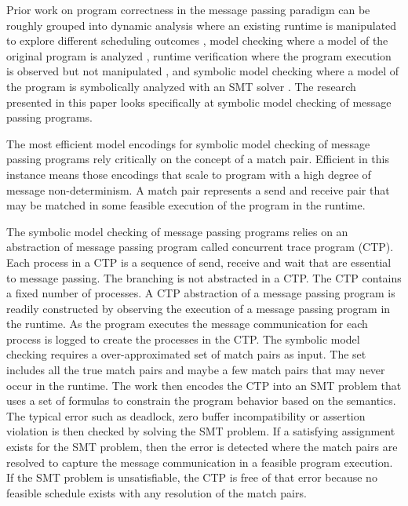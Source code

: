 Prior work on program correctness in the message passing paradigm can be roughly grouped into dynamic analysis where an existing runtime is manipulated to explore different scheduling outcomes \cite{DBLP:conf/ppopp/VakkalankaSGK08,DBLP:conf/sbmf/SharmaGB12}, model checking where a model of the original program is analyzed \cite{DBLP:conf/vmcai/Siegel07,DBLP:conf/pvm/Siegel07}, runtime verification where the program execution is observed but not manipulated \cite{DBLP:conf/sc/VetterS00,DBLP:conf/parco/KrammerBMR03,DBLP:conf/ptw/HilbrichSSM09}, and symbolic model checking where a model of the program is symbolically analyzed with an SMT solver \cite{DBLP:conf/kbse/HuangMM13,HuangNFM15,HuangDeadlock}. The research presented in this paper looks specifically at symbolic model checking of message passing programs.

The most efficient model encodings for symbolic model checking of message passing programs rely critically on the concept of a match pair. Efficient in this instance means those encodings that scale to program with a high degree of message non-determinism.  A match pair represents a send and receive pair that may be matched in some feasible execution of the program in the runtime. 

The symbolic model checking of message passing programs relies on an abstraction of message passing program called concurrent trace program (CTP). 
Each process in a CTP is a sequence of send, receive and wait that are essential to message passing. The branching is not abstracted in a CTP. 
The CTP contains a fixed number of processes. 
A CTP abstraction of a message passing program is readily constructed by observing the execution of a message passing program in the runtime. 
As the program executes the message communication for each process is logged to create the processes in the CTP.
The symbolic model checking requires a over-approximated set of match pairs as input. The set includes all the true match pairs and maybe a few match pairs that may never occur in the runtime. 
The work then encodes the CTP into an SMT problem that uses a set of formulas to constrain the program behavior based on the semantics. The typical error such as deadlock, zero buffer incompatibility or assertion violation is then checked by solving the SMT problem. If a satisfying assignment exists for the SMT problem, then the error is detected where the match pairs are resolved to capture the message communication in a feasible program execution. If the SMT problem is unsatisfiable, the CTP is free of that error because no feasible schedule exists with any resolution of the match pairs. 

